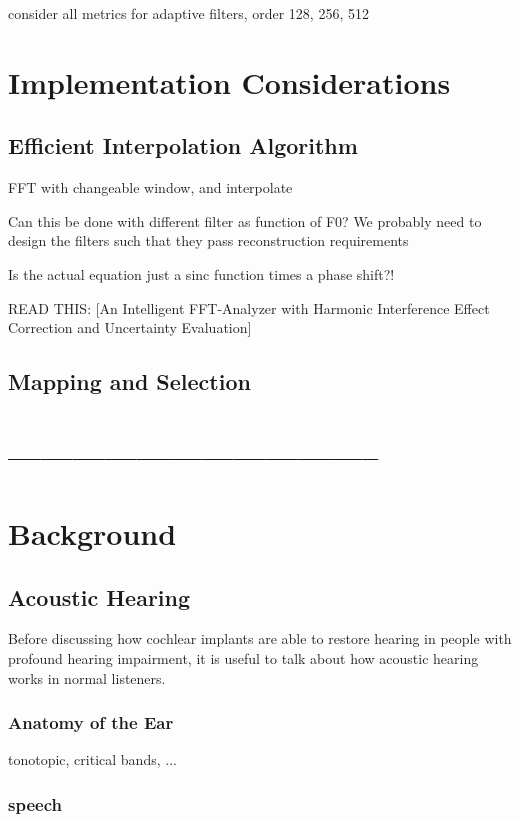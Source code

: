 \documentclass [11pt, proquest] {uwthesis}[2015/03/03]
\begin{document}
consider all metrics for adaptive filters, order 128, 256, 512


\chapter{Implementation Considerations}

\section{Efficient Interpolation Algorithm}

FFT with changeable window, and interpolate

Can this be done with different filter as function of F0?
We probably need to design the filters such that they pass reconstruction requirements

Is the actual equation just a sinc function times a phase shift?!

READ THIS: [An Intelligent FFT-Analyzer with Harmonic Interference Effect Correction and Uncertainty Evaluation]

\section{Mapping and Selection}

\chapter{-----------------------------------}


\chapter{Background}

\section{Acoustic Hearing}

Before discussing how cochlear implants are able to restore hearing in people with profound hearing impairment, it is useful to talk about how acoustic hearing works in normal listeners.

\subsection{Anatomy of the Ear}

tonotopic, critical bands, ...

\subsection{speech}
\end{document}
